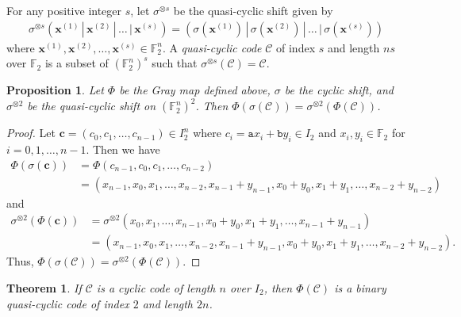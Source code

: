 \documentclass[12pt]{article}
\newtheorem{theorem}{Theorem}[section]
\newtheorem{proposition}[proposition]{Proposition}
\theoremstyle{definition}
\theoremstyle{plain}
\newcommand{\Blue}[1]{{ \color{blue} #1}}
\begin{document}
For any positive integer $s$, let $\sigma^{\otimes s}$ be the quasi-cyclic shift given by
\begin{align*}
\sigma^{\otimes s} ( \mathbf{x} ^{(1)} \, | \,  \mathbf{x}  ^{(2)} \, | \, \dotsc  \, |   \, \mathbf{x}  ^{(s)}  ) = ( \sigma ( \mathbf{x}  ^{(1)}  )  \, |  \,   \sigma ( \mathbf{x}  ^{(2)}  )  \,  |  \,  \dotsc  \,  |  \,  \sigma ( \mathbf{x}  ^{(s)}  ) )
\end{align*}
where $ \mathbf{x} ^{(1)} ,   \mathbf{x}  ^{(2)} , \dotsc ,  \mathbf{x}  ^{(s)} \in  \mathbb{F} _2^n$. A \textit{quasi-cyclic code} $\mathcal{C}$ of index $s$ and length $ns$ over $ \mathbb{F} _2$ is a subset of $( \mathbb{F} _2^n  )^s$ such that $\sigma^{\otimes s} (\mathcal{C}) = \mathcal{C}$.




\begin{proposition}  \label{prop: Gray map and quasi-cyclic shift}
Let $\Phi$ be the Gray map defined above, $\sigma$ be the cyclic shift, and $\sigma^{\otimes 2}$ be the quasi-cyclic shift on $( \mathbb{F} _2^n )^2$. Then $\Phi ( \sigma (\mathcal{C}) ) = \sigma^{\otimes 2} ( \Phi (\mathcal{C}) )$.
\end{proposition}


\begin{proof}
Let $ \mathbf{c} = (c_0 , c_1 , \dotsc , c_{n-1}) \in I_2^n$ where $c_i =  \mathtt{a}  x_i  +  \mathtt{b}  y_i \in I_2$ and $x_i, y_i \in   \mathbb{F} _2$ for $i = 0 , 1 , \dotsc , n-1$. Then we have
\begin{align*}
\Phi ( \sigma ( \mathbf{c} )) &= \Phi ( c_{n-1} , c_0 , c_1 , \dotsc , c_{n-2}  )  \\
&= ( x_{n-1} , x_0 , x_1 , \dotsc , x_{n-2} , x_{n-1} + y_{n-1} , x_0 + y_0 , x_1 + y_1 , \dotsc , x_{n-2} + y_{n-2}  )
\end{align*}
and
\begin{align*}
\sigma^{\otimes 2} (\Phi ( \mathbf{c} )) &= \sigma^{\otimes 2} (  x_0 , x_1 , \dotsc ,  x_{n-1} , x_0 + y_0 , x_1 + y_1 , \dotsc , x_{n-1} + y_{n-1}   )  \\
&= ( x_{n-1} , x_0 , x_1 , \dotsc , x_{n-2} , x_{n-1} + y_{n-1} , x_0 + y_0 , x_1 + y_1 , \dotsc , x_{n-2} + y_{n-2}  )  .
\end{align*}
Thus, $\Phi ( \sigma (\mathcal{C}) ) = \sigma^{\otimes 2} ( \Phi (\mathcal{C}) )$.
\end{proof}



\begin{theorem}  \label{thm: cyclic code implies Gray image is quasi-cyclic}
If $\mathcal{C}$ is a cyclic code of length $n$ over $I_2$, then $\Phi (\mathcal{C})$ is a binary quasi-cyclic code of index $2$ and length $2n$.
\end{theorem}
\end{document}
